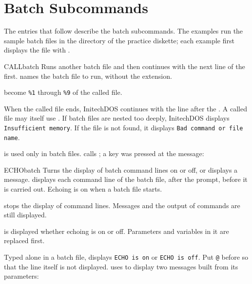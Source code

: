 \section{Batch Subcommands}
The entries that follow describe the batch subcommands.  The examples run
the sample batch files in the directory  of the practice
diskette; each example first displays the file with .

\begin{DosEntry}{CALL}{}{batch}
\Purpose Runs another batch file and then continues with the next line of
the first.
\Format {}
\Remarks
{} names the batch file to run, without the extension.

 become \texttt{\%1} through \texttt{\%9} of the called
file.

When the called file ends, InitechDOS continues with the line after the
.  A called file may itself use .  If batch files are
nested too deeply, InitechDOS displays \texttt{Insufficient memory}.  If
the file is not found, it displays \texttt{Bad command or file name}.

 is used only in batch files.
\Example
{} calls ; a key was pressed at the
 message:
\end{DosEntry}

\begin{DosEntry}{ECHO}{}{batch}
\Purpose Turns the display of batch command lines on or off, or displays a
message.
\Format {}
\Remarks
{} displays each command line of the batch file, after the prompt,
before it is carried out.  Echoing is on when a batch file starts.

 stops the display of command lines.  Messages and the output of
commands are still displayed.

 is displayed whether echoing is on or off.  Parameters and
variables in it are replaced first.

Typed alone in a batch file,  displays \texttt{ECHO is on} or
\texttt{ECHO is off}.  Put \texttt{@} before  so that the
 line itself is not displayed.
\Example
{} uses  to display two messages built from its
parameters:
\end{DosEntry}

